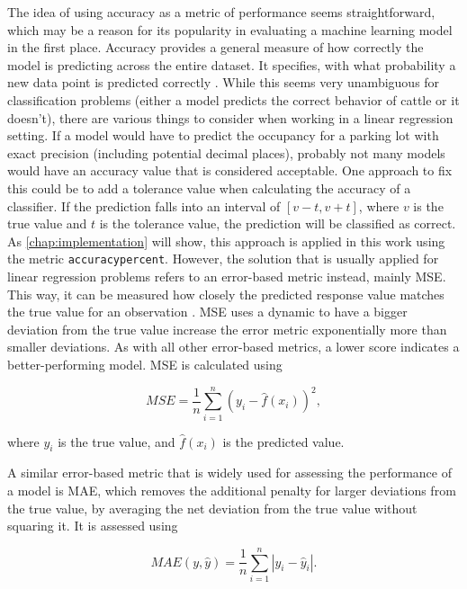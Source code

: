 The idea of using accuracy as a metric of performance seems straightforward, which may be a reason for its popularity in evaluating a machine learning model in the first place. Accuracy provides a general measure of how correctly the model is predicting across the entire dataset. It specifies, with what probability a new data point is predicted correctly \cite{grandini2020}. While this seems very unambiguous for classification problems (either a model predicts the correct behavior of cattle or it doesn’t), there are various things to consider when working in a linear regression setting. If a model would have to predict the occupancy for a parking lot with exact precision (including potential decimal places), probably not many models would have an accuracy value that is considered acceptable. One approach to fix this could be to add a tolerance value when calculating the accuracy of a classifier. If the prediction falls into an interval of $[v-t, v+t]$, where $v$ is the true value and $t$ is the tolerance value, the prediction will be classified as correct. As \autoref{chap:implementation} will show, this approach is applied in this work using the metric \texttt{accuracypercent}. However, the solution that is usually applied for linear regression problems refers to an error-based metric instead, mainly MSE. This way, it can be measured how closely the predicted response value matches the true value for an observation \cite{james2023}. MSE uses a dynamic to have a bigger deviation from the true value increase the error metric exponentially more than smaller deviations. As with all other error-based metrics, a lower score indicates a better-performing model. MSE is calculated using

\begin{equation*}
MSE = \frac{1}{n} \sum_{i=1}^n(y_i - \hat{f}(x_i))^2,
\label{mse}
\end{equation*}

where $y_i$ is the true value, and $\hat{f}(x_i)$ is the predicted value.

A similar error-based metric that is widely used for assessing the performance of a model is MAE, which removes the additional penalty for larger deviations from the true value, by averaging the net deviation from the true value without squaring it. It is assessed using 

\begin{equation*}
MAE(y,\hat{y}) = \frac{1}{n} \sum_{i=1}^n |y_i - \hat{y}_i|.
\label{mae}
\end{equation*}

